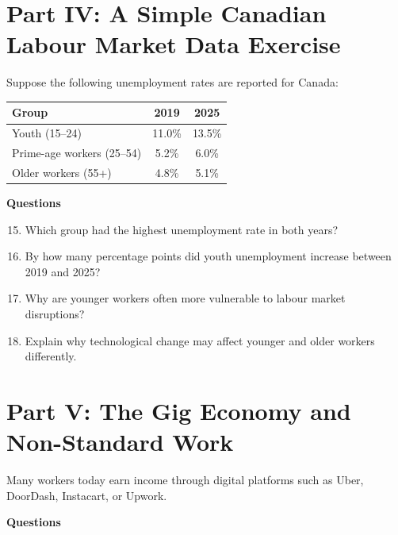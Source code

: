 \documentclass[12pt]{article}
\begin{document}
\section*{Part IV: A Simple Canadian Labour Market Data Exercise}

Suppose the following unemployment rates are reported for Canada:

\begin{center}
\begin{tabular}{lcc}
\toprule
Group & 2019 & 2025 \\
\midrule
Youth (15--24) & 11.0\% & 13.5\% \\
Prime-age workers (25--54) & 5.2\% & 6.0\% \\
Older workers (55+) & 4.8\% & 5.1\% \\
\bottomrule
\end{tabular}
\end{center}

\textbf{Questions}

\begin{enumerate}[label=\arabic*.]
\setcounter{enumi}{14}
\item Which group had the highest unemployment rate in both years?
\vspace{1.5cm}

\item By how many percentage points did youth unemployment increase between 2019 and 2025?
\vspace{1.5cm}

\item Why are younger workers often more vulnerable to labour market disruptions?
\vspace{2cm}

\item Explain why technological change may affect younger and older workers differently.
\vspace{2.5cm}
\end{enumerate}

\newpage

\section*{Part V: The Gig Economy and Non-Standard Work}

Many workers today earn income through digital platforms such as Uber, DoorDash, Instacart, or Upwork.

\textbf{Questions}
\end{document}

